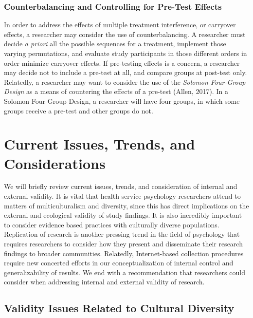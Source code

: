 \documentclass[
  11pt,
]{book}
\begin{document}
\subsubsection{Counterbalancing and Controlling for Pre-Test Effects}\label{counterbalancing-and-controlling-for-pre-test-effects}

In order to address the effects of multiple treatment interference, or carryover effects, a researcher may consider the use of counterbalancing. A researcher must decide \emph{a priori} all the possible sequences for a treatment, implement those varying permutations, and evaluate study participants in those different orders in order minimize carryover effects. If pre-testing effects is a concern, a researcher may decide not to include a pre-test at all, and compare groups at post-test only. Relatedly, a researcher may want to consider the use of the \emph{Solomon Four-Group Design} as a means of countering the effects of a pre-test (Allen, 2017). In a Solomon Four-Group Design, a researcher will have four groups, in which some groups receive a pre-test and other groups do not.

\section{Current Issues, Trends, and Considerations}\label{current-issues-trends-and-considerations}

We will briefly review current issues, trends, and consideration of internal and external validity. It is vital that health service psychology researchers attend to matters of multiculturalism and diversity, since this has direct implications on the external and ecological validity of study findings. It is also incredibly important to consider evidence based practices with culturally diverse populations. Replication of research is another pressing trend in the field of psychology that requires researchers to consider how they present and disseminate their research findings to broader communities. Relatedly, Internet-based collection procedures require new concerted efforts in our conceptualization of internal control and generalizability of results. We end with a recommendation that researchers could consider when addressing internal and external validity of research.

\subsection{Validity Issues Related to Cultural Diversity}\label{validity-issues-related-to-cultural-diversity}
\end{document}
